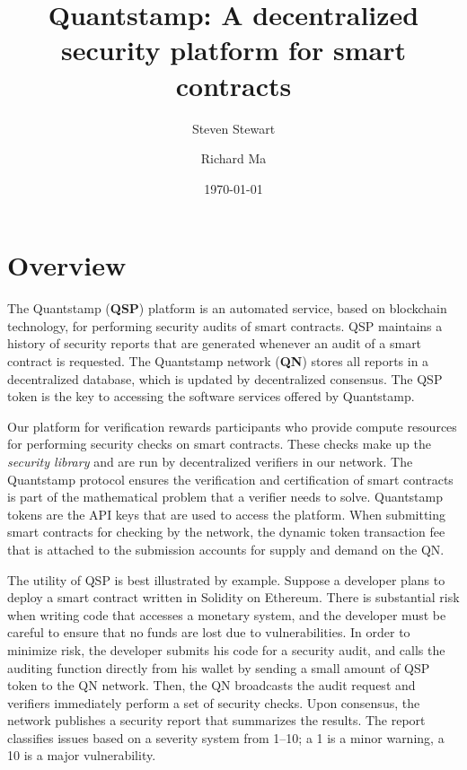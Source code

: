 \documentclass[final,smallcondensed]{llncs}
\begin{document}
\title{Quantstamp: A decentralized security platform for smart contracts}

\author{Steven Stewart \and Richard Ma}


\date{\today}

\maketitle

\section{Overview}
The Quantstamp ({\bfseries QSP}) platform is an automated service, based on blockchain technology, for performing security audits of smart contracts. QSP maintains a history of security reports that are generated whenever an audit of a smart contract is requested. The Quantstamp network ({\bfseries QN}) stores all reports in a decentralized database, which is updated by decentralized consensus. The QSP token is the key to accessing the software services offered by Quantstamp.

Our platform for verification rewards participants who provide compute resources for performing security checks on smart contracts. These checks make up the \emph{security library} and are run by decentralized verifiers in our network. The Quantstamp protocol ensures the verification and certification of smart contracts is part of the mathematical problem that a verifier needs to solve. Quantstamp tokens are the API keys that are used to access the platform. When submitting smart contracts for checking by the network, the dynamic token transaction fee that is attached to the submission accounts for supply and demand on the QN. 

The utility of QSP is best illustrated by example. Suppose a developer plans to deploy a smart contract written in Solidity on Ethereum. There is substantial risk when writing code that accesses a monetary system, and the developer must be careful to ensure that no funds are lost due to vulnerabilities. In order to minimize risk, the developer submits his code for a security audit, and calls the auditing function directly from his wallet by sending a small amount of QSP token to the QN network. Then, the QN broadcasts the audit request and verifiers immediately perform a set of security checks. Upon consensus, the network publishes a security report that summarizes the results. The report classifies issues based on a severity system from 1--10; a 1 is a minor warning, a 10 is a major vulnerability. 
\end{document}

